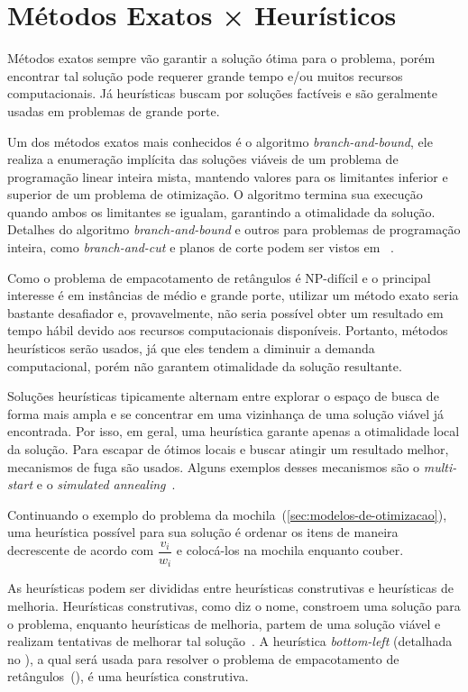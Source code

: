\section{Métodos Exatos × Heurísticos}\label{sec:metodos-exatos-heuristicos}

Métodos exatos sempre vão garantir a solução ótima para o problema, porém encontrar
tal solução pode requerer grande tempo e/ou muitos recursos computacionais.
Já heurísticas buscam por soluções factíveis e são geralmente usadas em problemas de grande porte.

Um dos métodos exatos mais conhecidos é o algoritmo \textit{branch-and-bound}, ele realiza a
enumeração implícita das soluções viáveis de um problema de programação linear inteira mista,
mantendo valores para os limitantes inferior e superior de um problema de otimização.
O algoritmo termina sua execução quando ambos os limitantes se igualam, garantindo a otimalidade
da solução.
Detalhes do algoritmo \textit{branch-and-bound} e outros para problemas de programação inteira,
como \textit{branch-and-cut} e planos de corte podem ser vistos em \citeauthor*{
    wolsey2020integer}~\citeyear{wolsey2020integer}.

Como o problema de empacotamento de retângulos é NP-difícil e o principal interesse é em instâncias
de médio e grande porte, utilizar um método exato seria bastante desafiador e, provavelmente,
não seria possível obter um resultado em tempo hábil devido aos recursos computacionais disponíveis.
Portanto, métodos heurísticos serão usados, já que eles tendem a diminuir a demanda computacional,
porém não garantem otimalidade da solução resultante.

Soluções heurísticas tipicamente alternam entre explorar o espaço de busca de forma mais ampla
e se concentrar em uma vizinhança de uma solução viável já encontrada.
Por isso, em geral, uma heurística garante apenas a otimalidade local da solução.
Para escapar de ótimos locais e buscar atingir um resultado melhor, mecanismos de fuga são usados.
Alguns exemplos desses mecanismos são o \textit{multi-start} e o \textit{simulated annealing}~\cite{
    firat2020effective,rakotonirainy2020improved,hopper2001empirical}.

Continuando o exemplo do problema da mochila~(\cref{sec:modelos-de-otimizacao}), uma heurística
possível para sua solução é ordenar os itens de maneira decrescente de acordo com $\dfrac{v_i}{w_i}$
e colocá-los na mochila enquanto couber.

As heurísticas podem ser divididas entre heurísticas construtivas e heurísticas de melhoria.
Heurísticas construtivas, como diz o nome, constroem uma solução para o problema,
enquanto heurísticas de melhoria, partem de uma solução viável e realizam tentativas de
melhorar tal solução~\cite{michalewicz2013solve}.
A heurística \textit{bottom-left} (detalhada no ), a qual será usada para
resolver o problema de empacotamento de retângulos~(),
é uma heurística construtiva.